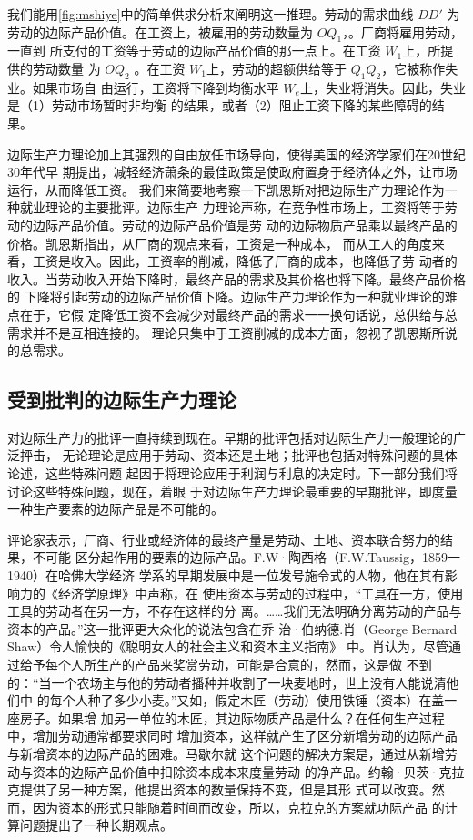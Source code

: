 我们能用\cref{fig:mshiye}中的简单供求分析来阐明这一推理。劳动的需求曲线 $DD'$ 为
劳动的边际产品价值。在工资上，被雇用的劳动数量为 $OQ_1$，。厂商将雇用劳动，一直到
所支付的工资等于劳动的边际产品价值的那一点上。在工资 $W_1$上，所提供的劳动数量
为 $OQ_2$ 。在工资 $W_1$上，劳动的超额供给等于 $Q_1Q_2$，它被称作失业。如果市场自
由运行，工资将下降到均衡水平 $W_e$上，失业将消失。因此，失业是（1）劳动市场暂时非均衡
的结果，或者（2）阻止工资下降的某些障碍的结果。

边际生产力理论加上其强烈的自由放任市场导向，使得美国的经济学家们在20世纪30年代早
期提出，减轻经济萧条的最佳政策是使政府置身于经济体之外，让市场运行，从而降低工资。
我们来简要地考察一下凯恩斯对把边际生产力理论作为一种就业理论的主要批评。边际生产
力理论声称，在竞争性市场上，工资将等于劳动的边际产品价值。劳动的边际产品价值是劳
动的边际物质产品乘以最终产品的价格。凯恩斯指出，从厂商的观点来看，工资是一种成本，
而从工人的角度来看，工资是收入。因此，工资率的削减，降低了厂商的成本，也降低了劳
动者的收入。当劳动收入开始下降时，最终产品的需求及其价格也将下降。最终产品价格的
下降将引起劳动的边际产品价值下降。边际生产力理论作为一种就业理论的难点在于，它假
定降低工资不会减少对最终产品的需求一一换句话说，总供给与总需求并不是互相连接的。
理论只集中于工资削减的成本方面，忽视了凯恩斯所说的总需求。

\subsection{受到批判的边际生产力理论}

对边际生产力的批评一直持续到现在。早期的批评包括对边际生产力一般理论的广泛抨击，
无论理论是应用于劳动、资本还是土地；批评也包括对特殊问题的具体论述，这些特殊问题
起因于将理论应用于利润与利息的决定时。下一部分我们将讨论这些特殊问题，现在，着眼
于对边际生产力理论最重要的早期批评，即度量一种生产要素的边际产品是不可能的。

评论家表示，厂商、行业或经济体的最终产量是劳动、土地、资本联合努力的结果，不可能
区分起作用的要素的边际产品。F.W·陶西格（F.W.Taussig，1859一1940）在哈佛大学经济
学系的早期发展中是一位发号施令式的人物，他在其有影响力的《经济学原理》中声称，在
使用资本与劳动的过程中，“工具在一方，使用工具的劳动者在另一方，不存在这样的分
离。……我们无法明确分离劳动的产品与资本的产品。”这一批评更大众化的说法包含在乔
治·伯纳德.肖（George Bernard Shaw）令人愉快的《聪明女人的社会主义和资本主义指南》
中。肖认为，尽管通过给予每个人所生产的产品来奖赏劳动，可能是合意的，然而，这是做
不到的：“当一个农场主与他的劳动者播种并收割了一块麦地时，世上没有人能说清他们中
的每个人种了多少小麦。”又如，假定木匠（劳动）使用铁锤（资本）在盖一座房子。如果增
加另一单位的木匠，其边际物质产品是什么？在任何生产过程中，增加劳动通常都要求同时
增加资本，这样就产生了区分新增劳动的边际产品与新增资本的边际产品的困难。马歇尔就
这个问题的解决方案是，通过从新增劳动与资本的边际产品价值中扣除资本成本来度量劳动
的净产品。约翰·贝茨·克拉克提供了另一种方案，他提出资本的数量保持不变，但是其形
式可以改变。然而，因为资本的形式只能随着时间而改变，所以，克拉克的方案就功际产品
的计算问题提出了一种长期观点。

